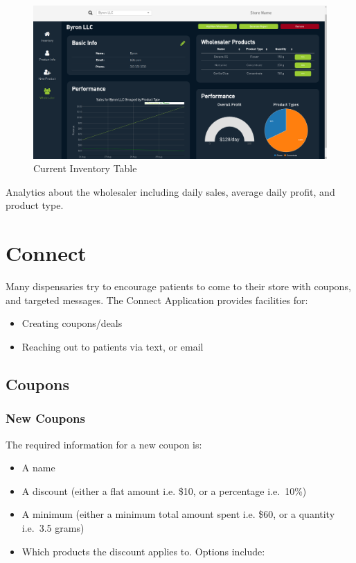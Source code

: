 \documentclass[]{book}
\theoremstyle{definition}
\theoremstyle{definition}
\theoremstyle{definition}
\theoremstyle{remark}
\begin{document}
\begin{figure}
\centering
\includegraphics{images/I7.png}
\caption{Current Inventory Table}
\end{figure}

Analytics about the wholesaler including daily sales, average daily
profit, and product type.

\chapter{Connect}\label{connect}

Many dispensaries try to encourage patients to come to their store with
coupons, and targeted messages. The Connect Application provides
facilities for:

\begin{itemize}
\item
  Creating coupons/deals
\item
  Reaching out to patients via text, or email
\end{itemize}

\section{Coupons}\label{coupons}

\subsection{New Coupons}\label{new-coupons}

The required information for a new coupon is:

\begin{itemize}
\item
  A name
\item
  A discount (either a flat amount i.e. \$10, or a percentage i.e.~10\%)
\item
  A minimum (either a minimum total amount spent i.e. \$60, or a
  quantity i.e.~3.5 grams)
\item
  Which products the discount applies to. Options include:
\end{itemize}
\end{document}
